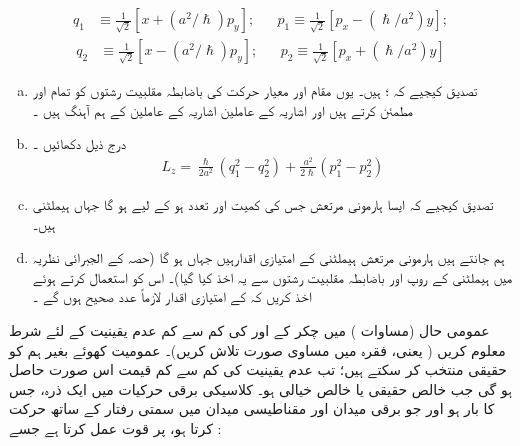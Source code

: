\begin{align*}
    q_1&\equiv \frac{1}{\sqrt{2}}[x+(a^2/\hslash)p_y]; && p_1\equiv\frac{1}{\sqrt{2}}[p_x-(\hslash/a^2)y];
\end{align*}
\begin{align*}
    q_2&\equiv\frac{1}{\sqrt{2}}[x-(a^2/\hslash)p_y]; &&p_2\equiv\frac{1}{\sqrt{2}}[p_x+(\hslash/a^2)y]
\end{align*}
\begin{enumerate}[a.]
\item
  تصدیق کیجیے  کہ ؛       ہیں۔ یوں مقام اور معیار حرکت کی باضابطہ مقلبیت  رشتوں کو تمام    اور   مطمئن کرتے ہیں اور اشاریہ   کے عاملین اشاریہ  کے عاملین کے ہم آہنگ ہیں ۔
\item
  درج ذیل دکھائیں ۔
\begin{align*}
    L_z=\frac{\hslash}{2a^2}(q_1^2-q_2^2)+\frac{a^2}{2\hslash}(p_1^2-p_2^2)
\end{align*}
\item
 تصدیق کیجیے  کہ  ایسا ہارمونی مرتعش جس کی کمیت     اور تعدد   ہو  کے لیے ہو  گا جہاں  ہیملٹنی ہیں۔ 
\item
 ہم جانتے ہیں  ہارمونی مرتعش  ہیملٹنی کے   امتیازی اقدارہیں جہاں ہو گا
  (حصہ   کے الجبرائی نظریہ میں ہیملٹنی کے روپ اور
 باضابطہ  مقلبیت رشتوں سے یہ اخذ کیا گیا)۔  اس کو استعمال کرتے ہوئے  اخذ کریں کہ  کے امتیازی اقدار لازماً عدد صحیح  ہوں گے ۔
\end{enumerate}
عمومی حال  (مساوات  )   میں  چکر کے  اور  کی کم سے کم عدم یقینیت کے لئے   شرط معلوم کریں ( یعنی، فقرہ   میں مساوی   صورت  تلاش کریں)۔  عمومیت کھوئے  بغیر ہم   کو حقیقی منتخب کر سکتے ہیں؛  تب عدم یقینیت کی کم سے کم قیمت اس صورت  حاصل ہو گی جب   خالص حقیقی یا خالص  خیالی ہو۔
کلاسیکی برقی حرکیات میں ایک ذرہ، جس کا بار   ہو اور جو  برقی  میدان  اور   مقناطیسی میدان  میں سمتی رفتار   کے ساتھ حرکت کرتا ہو، پر قوت عمل کرتا ہے جسے  :
